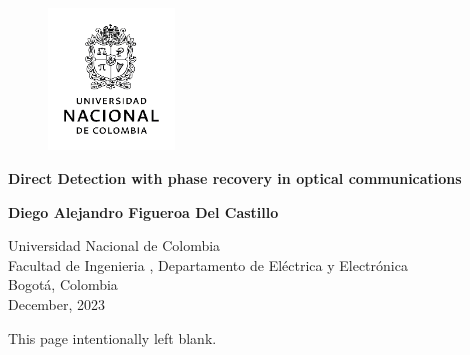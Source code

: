 
\begin{titlepage}
    \begin{center}
          
      	\begin{figure}[ht]
      		\includegraphics[width=0.3\textwidth]{images/preliminaries/EscudoUNAL.png}
      		\centering
      	\end{figure}
            
        \vspace{3.5cm}
            
        \LARGE{\textbf{Direct Detection with phase recovery in optical communications }}
        
        \vspace{3.5cm}
        \large{\textbf{Diego Alejandro Figueroa Del Castillo}}
        \vfill
        
        
        \normalsize{Universidad Nacional de Colombia\\
					Facultad de Ingenieria , Departamento de Eléctrica y Electrónica\\
					Bogotá, Colombia\\
					December, 2023}
            
    \end{center}
\end{titlepage}
\clearpage\begingroup
\mbox{}
                \vspace*{\fill}
                \begin{center}
                  This page intentionally left blank.
                \end{center}
                \vspace{\fill}
                \pagestyle{empty}\cleardoublepage\endgroup


\makeatletter
              \def\cleardoublepage{\clearpage\if@twoside \ifodd\c@page\else
               \begingroup
                \mbox{}
                \vspace*{\fill}
                \begin{center}
                  This page intentionally left blank.
                \end{center}
                \vspace{\fill}
                \thispagestyle{plain}
\newpage
                \if@twocolumn\mbox{}\newpage\fi
               \endgroup\fi\fi}
              \makeatother
